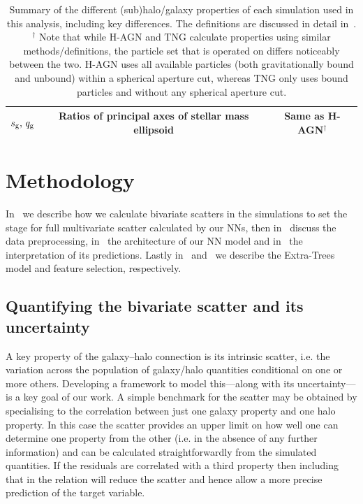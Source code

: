 \documentclass[useAMS,usenatbib]{mnras}
\begin{document}
\begin{table}
\begin{tabular}{ccc}
        $s_{\rm g},\,q_{\rm g}$ & Ratios of principal axes of stellar mass ellipsoid & Same as H-AGN$^\dagger$\\
        \hline
    \end{tabular}
    \caption{Summary of the different (sub)halo/galaxy properties of each simulation used in this analysis, including key differences. The definitions are discussed in detail in~. \\[5pt]
    $^\dagger$ Note that while H-AGN and TNG calculate properties using similar methods/definitions, the particle set that is operated on differs noticeably between the two. H-AGN uses all available particles (both gravitationally bound and unbound) within a spherical aperture cut, whereas TNG only uses bound particles and without any spherical aperture cut.}
    \label{tab:properties}
\end{table}

\section{Methodology}
\label{sec:methodology}

In~ we describe how we calculate bivariate scatters in the simulations to set the stage for full multivariate scatter calculated by our \acp{NN}, then in~ discuss the data preprocessing, in~ the architecture of our \ac{NN} model and in~ the interpretation of its predictions. Lastly in~ and~ we describe the Extra-Trees model and feature selection, respectively.


\subsection{Quantifying the bivariate scatter and its uncertainty}
\label{sec:sim_scatter}


A key property of the galaxy--halo connection is its intrinsic scatter, i.e. the variation across the population of galaxy/halo quantities conditional on one or more others. Developing a framework to model this---along with its uncertainty---is a key goal of our work. A simple benchmark for the scatter may be obtained by specialising to the correlation between just one galaxy property and one halo property. In this case the scatter provides an upper limit on how well one can determine one property from the other (i.e. in the absence of any further information) and can be calculated straightforwardly from the simulated quantities. If the residuals are correlated with a third property then including that in the relation will reduce the scatter and hence allow a more precise prediction of the target variable.
\end{document}
